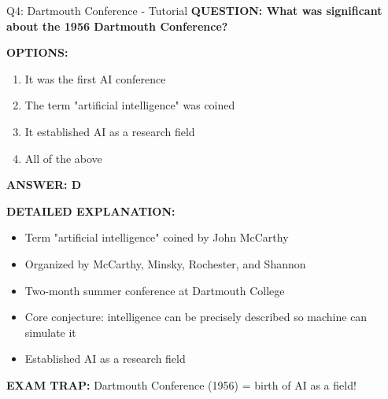 \documentclass[8pt]{beamer}
\begin{document}
	\begin{frame}{Q4: Dartmouth Conference - Tutorial}
		\fontsize{6.5}{7.5}\selectfont
		\textbf{QUESTION: What was significant about the 1956 Dartmouth Conference?}
		
		\vspace{0.1cm}
		\textbf{OPTIONS:}
		\begin{enumerate}
			\item It was the first AI conference
			\item The term "artificial intelligence" was coined
			\item It established AI as a research field
			\item All of the above
		\end{enumerate}
		
		\vspace{0.1cm}
		\textcolor{myblue}{\textbf{ANSWER: D}}
		
		\vspace{0.1cm}
		\textbf{DETAILED EXPLANATION:}
		\begin{itemize}
			\item Term "artificial intelligence" coined by John McCarthy
			\item Organized by McCarthy, Minsky, Rochester, and Shannon
			\item Two-month summer conference at Dartmouth College
			\item Core conjecture: intelligence can be precisely described so machine can simulate it
			\item Established AI as a research field
		\end{itemize}
		
		\vspace{0.1cm}
		\textcolor{myred}{\textbf{EXAM TRAP:}} Dartmouth Conference (1956) = \textcolor{myblue}{birth of AI as a field}!
	\end{frame}
	
\end{document}
